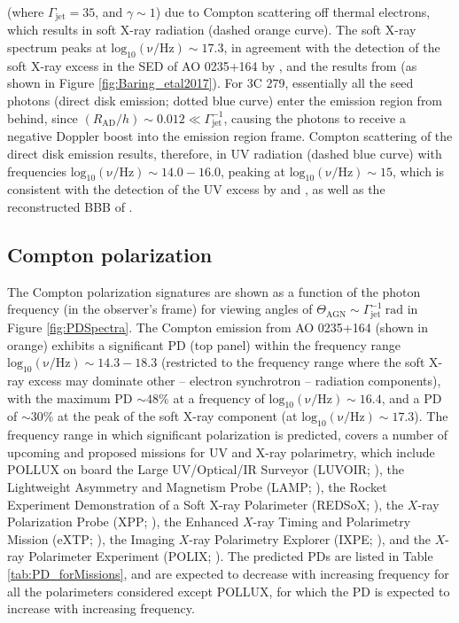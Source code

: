 \documentclass[twocolumn, tighten, twocolappendix]{aastex63}
\begin{document}
\noindent (where $\Gamma_{\mathrm{jet}} = 35$, and $\gamma \sim 1$) due to Compton scattering off thermal electrons, which results in soft X-ray radiation (dashed orange curve). The soft X-ray spectrum peaks at $\mathrm{log_{10}(\nu/ Hz)}\sim 17.3$, in agreement with the detection of the soft X-ray excess in the SED of AO 0235+164 by \cite{Ackermann_etal2012}, and the results from \cite{Baring_etal2017} (as shown in Figure \ref{fig:Baring_etal2017}). For 3C 279, essentially all the seed photons (direct disk emission; dotted blue curve) enter the emission region from behind, since $(R_{\mathrm{AD}}/h) \sim 0.012 \ll \Gamma_{\mathrm{jet}}^{-1}$, causing the photons to receive a negative Doppler boost into the emission region frame. Compton scattering of the direct disk emission results, therefore, in UV radiation (dashed blue curve) with frequencies $\mathrm{log_{10}(\nu/ Hz)}\sim 14.0 - 16.0$, peaking at $\mathrm{log_{10}(\nu/ Hz)}\sim 15$, which is consistent with the detection of the UV excess by \cite{Pian_etal1999} and \cite{Paliya_etal2015}, as well as the reconstructed BBB of \cite{Roustazadeh_Botther_2012}.
\subsection{Compton polarization}\label{ComptonPol}
The Compton polarization signatures are shown as a function of the photon frequency (in the observer's frame) for viewing angles of $\Theta_{\mathrm{AGN}} \sim \Gamma_{\mathrm{jet}}^{-1}~\mathrm{rad}$ in Figure \ref{fig:PDSpectra}. The Compton emission from AO 0235+164 (shown in orange) exhibits a significant PD (top panel) within the frequency range $\mathrm{log_{10}(\nu/ Hz)}\sim 14.3 - 18.3$ (restricted to the frequency range where the soft X-ray excess may dominate other -- electron synchrotron -- radiation components), with the maximum PD $\sim 48 \%$ at a frequency of $\mathrm{log_{10}(\nu/ Hz)}\sim 16.4$, and a PD of $\sim 30 \%$ at the peak of the soft X-ray component (at $\mathrm{log_{10}(\nu/ Hz)}\sim 17.3$). The frequency range in which significant polarization is predicted, covers a number of upcoming and proposed missions for UV and X-ray polarimetry, which include POLLUX on board the Large UV/Optical/IR Surveyor (LUVOIR; \cite{POLLUX_2019}), the Lightweight Asymmetry and Magnetism Probe (LAMP; \cite{LAMP_2019}), the Rocket Experiment Demonstration of a Soft X-ray Polarimeter (REDSoX; \cite{REDSoX_2019}), the $X$-ray Polarization Probe (XPP; \cite{XPP_2019b}), the Enhanced $X$-ray Timing and Polarimetry Mission (eXTP; \cite{eXTP_2019}), the Imaging $X$-ray Polarimetry Explorer (IXPE; \cite{IXPE_2020}), and the $X$-ray Polarimeter Experiment (POLIX; \cite{POLIX_2016}). The predicted PDs are listed in Table \ref{tab:PD_forMissions}, and are expected to decrease with increasing frequency for all the polarimeters considered except POLLUX, for which the PD is expected to increase with increasing frequency. 
\end{document}
